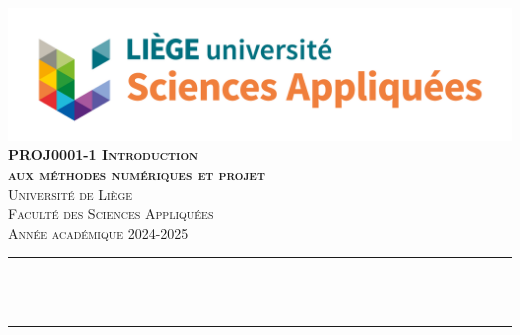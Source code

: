\begin{titlepage}

\newcommand{\HRule}{\rule{\linewidth}{0.5mm}} %





\begin{center} %


\includegraphics[width = 15cm]{./figures/uliege_faculte_sciencesappliquees_logo_rvb}\\[1.5cm] 
\textbf{\textsc{\Large PROJ0001-1 Introduction \\
aux méthodes numériques et projet}}\\[1.0cm] 
\textsc{\Large Université de Liège}\\[0.5cm] 
\textsc{\large Faculté des Sciences Appliquées}\\[0.45cm] 
\textsc{\large Année académique 2024-2025}\\[0.45cm] 



\HRule \\[0.4cm]
{ \huge \bfseries \reporttitle}\\ %
\HRule \\[1.5cm]
\end{center}


\end{titlepage}
